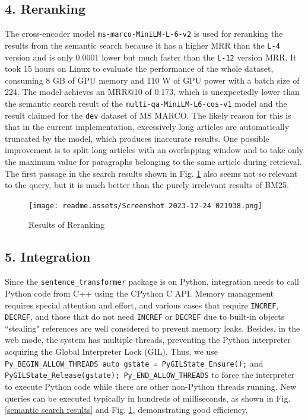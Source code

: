 \documentclass[11pt]{article}
\begin{document}
\hypertarget{4-reranking}{%
\subsection{4. Reranking}\label{4-reranking}}

The cross-encoder model \texttt{ms-marco-MiniLM-L-6-v2} is used for
reranking the results from the semantic search because it has a higher
MRR than the \texttt{L-4} version and is only 0.0001 lower but much
faster than the \texttt{L-12} version MRR. It took 15 hours on Linux to
evaluate the performance of the whole dataset, consuming 8 GB of GPU
memory and 110 W of GPU power with a batch size of 224. The model
achieves an MRR@10 of 0.173, which is unexpectedly lower than the
semantic search result of the \texttt{multi-qa-MiniLM-L6-cos-v1} model 
and the result claimed for the \texttt{dev}
dataset of MS MARCO. The likely reason for this is that in the current
implementation, excessively long articles are automatically truncated by
the model, which produces inaccurate results. One possible improvement
is to split long articles with an overlapping window and to take only
the maximum value for paragraphs belonging to the same article during
retrieval. The first passage in the search results shown in Fig. \ref{reranking results} also
seems not so relevant to the query, but it is much better than the
purely irrelevant results of BM25.

\begin{figure}
\texttt{[image: readme.assets/Screenshot 2023-12-24 021938.png]}
\caption{Results of Reranking}
\label{reranking results}
\end{figure}

\hypertarget{5-integration}{%
\subsection{5. Integration}\label{5-integration}}

Since the \texttt{sentence\_transformer} package is on Python,
integration needs to call Python code from C++ using the CPython C API.
Memory management requires special attention and effort, and various
cases that require \texttt{INCREF}, \texttt{DECREF}, and those that do
not need \texttt{INCREF} or \texttt{DECREF} due to built-in objects
``stealing" references are well considered to prevent memory leaks.
Besides, in the web mode, the system has multiple threads, preventing
the Python interpreter acquiring the Global Interpreter Lock (GIL).
Thus, we use
\texttt{Py\_BEGIN\_ALLOW\_THREADS\ auto\ gstate\ =\ PyGILState\_Ensure();}
and \texttt{PyGILState\_Release(gstate);\ Py\_END\_ALLOW\_THREADS} to
force the interpreter to execute Python code while there are other
non-Python threads running. New queries can be executed typically in
hundreds of milliseconds, as shown in Fig. \ref{semantic search results} and Fig. \ref{reranking results}, demonstrating
good efficiency.
\end{document}
